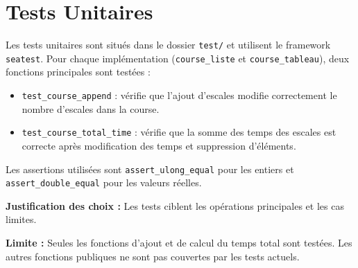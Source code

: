 \section{Tests Unitaires}\label{tests}

Les tests unitaires sont situés dans le dossier \texttt{test/} et utilisent le framework \texttt{seatest}.
Pour chaque implémentation (\texttt{course\_liste} et \texttt{course\_tableau}), deux fonctions principales sont testées :

\begin{itemize}
    \item \texttt{test\_course\_append} : vérifie que l'ajout d'escales modifie correctement le nombre d'escales dans la course.
    \item \texttt{test\_course\_total\_time} : vérifie que la somme des temps des escales est correcte après modification des temps et suppression d'éléments.
\end{itemize}

Les assertions utilisées sont \texttt{assert\_ulong\_equal} pour les entiers et \texttt{assert\_double\_equal} pour les valeurs réelles.

\textbf{Justification des choix :}
Les tests ciblent les opérations principales et les cas limites.


\textbf{Limite :}
Seules les fonctions d'ajout et de calcul du temps total sont testées.
Les autres fonctions publiques ne sont pas couvertes par les tests actuels.
